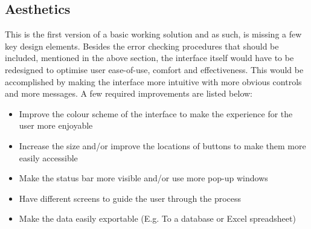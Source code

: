\subsection{Aesthetics}
This is the first version of a basic working solution and as such, is missing a few key design elements. Besides the error checking procedures that should be included, mentioned in the above section, the interface itself would have to be redesigned to optimise user ease-of-use, comfort and effectiveness. This would be accomplished by making the interface more intuitive with more obvious controls and more messages. A few required improvements are listed below:

\begin{itemize}
	\item Improve the colour scheme of the interface to make the experience for the user more enjoyable
	\item Increase the size and/or improve the locations of buttons to make them more easily accessible
	\item Make the status bar more visible and/or use more pop-up windows
	\item Have different screens to guide the user through the process
	\item Make the data easily exportable (E.g. To a database or Excel spreadsheet)
\end{itemize} 

